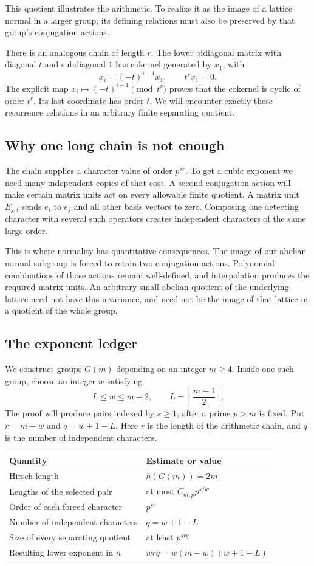 \documentclass[11pt]{article}
\numberwithin{equation}{section}
\theoremstyle{definition}
\theoremstyle{remark}
\begin{document}
This quotient illustrates the arithmetic. To realize it as the image of a lattice normal in a larger group, its defining relations must also be preserved by that group's conjugation actions.

There is an analogous chain of length $r$. The lower bidiagonal matrix with diagonal $t$ and subdiagonal $1$ has cokernel generated by $x_1$, with
\[
x_i=(-t)^{i-1}x_1,\qquad t^r x_1=0.
\]
The explicit map $x_i\mapsto(-t)^{i-1}\pmod{t^r}$ proves that the cokernel is cyclic of order $t^r$. Its last coordinate has order $t$. We will encounter exactly these recurrence relations in an arbitrary finite separating quotient.

\subsection{Why one long chain is not enough}
The chain supplies a character value of order $p^{sr}$. To get a cubic exponent we need many independent copies of that cost. A second conjugation action will make certain matrix units act on every allowable finite quotient. A matrix unit $E_{j,i}$ sends $e_i$ to $e_j$ and all other basis vectors to zero. Composing one detecting character with several such operators creates independent characters of the same large order.

This is where normality has quantitative consequences. The image of our abelian normal subgroup is forced to retain two conjugation actions. Polynomial combinations of those actions remain well-defined, and interpolation produces the required matrix units. An arbitrary small abelian quotient of the underlying lattice need not have this invariance, and need not be the image of that lattice in a quotient of the whole group.

\subsection{The exponent ledger}
We construct groups $G(m)$ depending on an integer $m\ge4$. Inside one such group, choose an integer $w$ satisfying
\[
L\le w\le m-2,\qquad L=\left\lceil\frac{m-1}{2}\right\rceil.
\]
The proof will produce pairs indexed by $s\ge1$, after a prime $p>m$ is fixed. Put $r=m-w$ and $q=w+1-L$. Here $r$ is the length of the arithmetic chain, and $q$ is the number of independent characters.

\begin{center}
\begin{tabular}{@{}p{}p{}@{}}
\toprule
Quantity & Estimate or value \\
\midrule
Hirsch length & $h(G(m))=2m$ \\
Lengths of the selected pair & at most $C_{m,p}p^{s/w}$ \\
Order of each forced character & $p^{sr}$ \\
Number of independent characters & $q=w+1-L$ \\
Size of every separating quotient & at least $p^{srq}$ \\
Resulting lower exponent in $n$ & $wrq=w(m-w)(w+1-L)$ \\
\bottomrule
\end{tabular}
\end{center}
\end{document}
